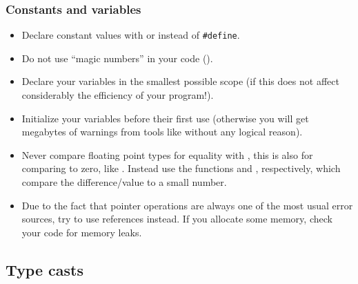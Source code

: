\subsubsection{Constants and variables}

\begin{itemize}
\item Declare constant values with  or  instead of
\verb+#define+.
\item Do not use ``magic numbers'' in your code ().
\item Declare your variables in the smallest possible scope (if this does not
  affect considerably the efficiency of your program!).
\item Initialize your variables before their first use (otherwise you will get
  megabytes of warnings from tools like  without any logical
  reason).
\item Never compare floating point types for equality with \code{==},
  this is also for comparing to zero, like . Instead use the
  functions  and , respectively,
  which compare the difference/value to a small number.
\item Due to the fact that pointer operations are always one of the most usual
  error sources, try to use references instead.  If you allocate some memory,
  check your code for memory leaks.
\end{itemize}

\subsection{Type casts}

